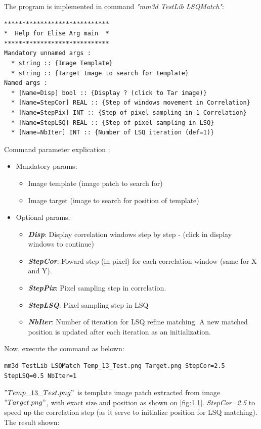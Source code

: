 \documentclass[twoside]{article}
\begin{document}
The program is implemented in command {\color{red}\textit{"mm3d TestLib LSQMatch"}}: 

\begin{verbatim}
*****************************
*  Help for Elise Arg main  *
*****************************
Mandatory unnamed args : 
  * string :: {Image Template}
  * string :: {Target Image to search for template}
Named args : 
  * [Name=Disp] bool :: {Display ? (click to Tar image)}
  * [Name=StepCor] REAL :: {Step of windows movement in Correlation}
  * [Name=StepPix] INT :: {Step of pixel sampling in 1 Correlation}
  * [Name=StepLSQ] REAL :: {Step of pixel sampling in LSQ}
  * [Name=NbIter] INT :: {Number of LSQ iteration (def=1)}
\end{verbatim}

Command parameter explication : 
\begin{itemize}
  \item Mandatory params:
  	\begin{itemize}
  		\item Image template (image patch to search for)
  		\item Image target (image to search for position of template)
  	\end{itemize}
  \item Optional params:
  	\begin{itemize}
  		\item \textit{\textbf{Disp}}: Display correlation windows step by step - (click in display windows to continue)
  		\item \textit{\textbf{StepCor}}: Foward step (in pixel) for each correlation window (same for X and Y).
  		\item \textit{\textbf{StepPix}}: Pixel sampling step in correlation. 
  		\item \textit{\textbf{StepLSQ}}: Pixel sampling step in LSQ
  		\item \textit{\textbf{NbIter}}: Number of iteration for LSQ refine matching. A new matched position is updated after each iteration as an initialization.
  	\end{itemize}
\end{itemize}

Now, execute the command as belown: 
\begin{verbatim}
mm3d TestLib LSQMatch Temp_13_Test.png Target.png StepCor=2.5 StepLSQ=0.5 NbIter=1
\end{verbatim}

$"Temp\_13\_Test.png"$ is template image patch extracted from image $"Target.png"$, with exact size and position as shown on \ref{fig:1.1}. \textit{StepCor=2.5} to speed up the correlation step (as it serve to initialize position for LSQ matching). The result shown:
\end{document}
